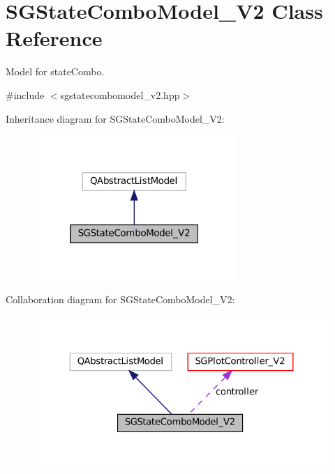 \hypertarget{classSGStateComboModel__V2}{}\section{S\+G\+State\+Combo\+Model\+\_\+\+V2 Class Reference}
\label{classSGStateComboModel__V2}


Model for state\+Combo.  




{\ttfamily \#include $<$sgstatecombomodel\+\_\+v2.\+hpp$>$}



Inheritance diagram for S\+G\+State\+Combo\+Model\+\_\+\+V2\+:
\nopagebreak
\begin{figure}[H]
\begin{center}
\leavevmode
\includegraphics[width=217pt]{classSGStateComboModel__V2__inherit__graph}
\end{center}
\end{figure}


Collaboration diagram for S\+G\+State\+Combo\+Model\+\_\+\+V2\+:
\nopagebreak
\begin{figure}[H]
\begin{center}
\leavevmode
\includegraphics[width=324pt]{classSGStateComboModel__V2__coll__graph}
\end{center}
\end{figure}
